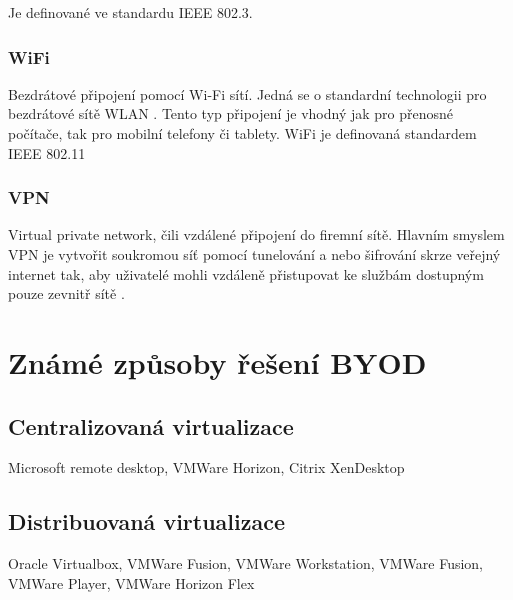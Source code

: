  Je definované ve standardu IEEE 802.3.%
 
 \subsubsection{WiFi} %
 
 Bezdrátové připojení pomocí Wi-Fi sítí. Jedná se o standardní technologii pro bezdrátové sítě WLAN \cite{pcmagWifi}. Tento typ připojení je vhodný jak pro přenosné počítače, tak pro mobilní telefony či tablety. WiFi je definovaná standardem IEEE 802.11
 
 \subsubsection{VPN} %
 Virtual private network, čili vzdálené připojení do firemní sítě. Hlavním smyslem VPN je vytvořit soukromou síť pomocí tunelování a nebo šifrování skrze veřejný internet tak, aby uživatelé mohli vzdáleně přistupovat ke službám dostupným pouze zevnitř sítě \cite{ciscoJournal}.
 
 
 
 
 
 \section{Známé způsoby řešení BYOD}

 
 \subsection{Centralizovaná virtualizace}
 Microsoft remote desktop, VMWare Horizon, Citrix XenDesktop
 
 
 \subsection{Distribuovaná virtualizace}
 Oracle Virtualbox, VMWare Fusion, VMWare Workstation, VMWare Fusion, VMWare Player, VMWare Horizon Flex
 
